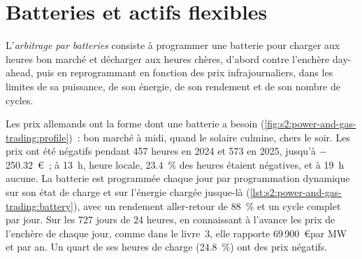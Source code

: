 \section{Batteries et actifs flexibles}

\begin{definition}\label{def:s2:power-and-gas-trading:battery}
L'\emph{arbitrage par batteries} consiste à programmer une batterie pour charger aux heures bon marché et décharger aux heures chères, d'abord
contre l'enchère day-ahead, puis en reprogrammant en fonction des prix infrajournaliers, dans les limites de sa puissance, de son énergie, de son rendement et de son nombre de cycles.
\end{definition}

Les prix allemands ont la forme dont une batterie a besoin (\cref{fig:s2:power-and-gas-trading:profile})~: bon marché à midi, quand le solaire culmine, chers le soir.
Les prix ont été négatifs pendant 457 heures en 2024 et 573 en 2025, jusqu'à $-$250.32~\euro~; à 13~h, heure locale, 23.4~\% des heures étaient négatives, et à 19~h
aucune. La batterie est programmée chaque jour par programmation dynamique sur son état de charge et sur l'énergie chargée jusque-là
(\cref{lst:s2:power-and-gas-trading:battery}), avec un rendement aller-retour de 88~\% et un cycle complet par jour. Sur les 727 jours de 24 heures, en connaissant
à l'avance les prix de l'enchère de chaque jour, comme dans le livre~3, elle rapporte 69\,900~\euro par MW et par an. Un quart de ses heures de charge (24.8~\%) ont des prix négatifs.

